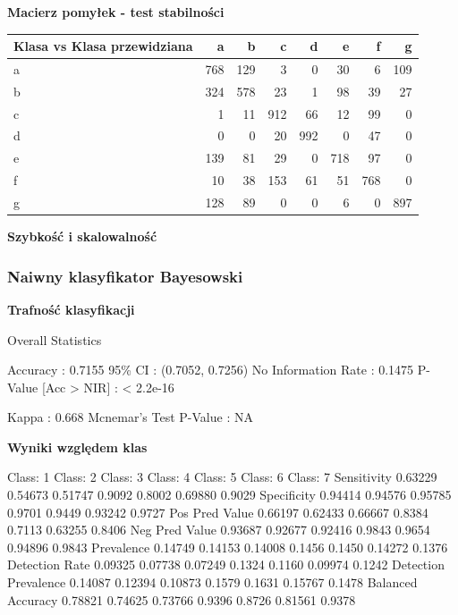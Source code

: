\documentclass[11pt]{article} %
\begin{document}
\textbf{Macierz pomyłek - test stabilności}

\begin{center}
    \begin{tabular}{ | l | r | r | r | r | r | r | r | }
    \hline
 Klasa vs Klasa przewidziana &  a &  b &  c &  d &  e &  f &  g \\ \hline
a & 768 & 129 &  3 &  0 & 30  & 6 & 109 \\
b & 324 & 578 & 23 &  1 & 98 & 39 & 27 \\
c &  1 & 11 & 912 & 66 & 12 & 99 &  0 \\
d &  0  & 0 & 20 & 992 &  0 & 47 &  0 \\
e & 139 & 81 & 29 &  0 & 718 & 97 &  0 \\
f & 10 & 38 & 153 & 61 & 51 & 768 &  0 \\
g & 128 & 89 &  0 &  0 &  6  & 0 & 897 \\ \hline
    \end{tabular}
\end{center}

\textbf{Szybkość i skalowalność}

\subsubsection{Naiwny klasyfikator Bayesowski}

\textbf{Trafność klasyfikacji}

    Overall Statistics
                                          
               Accuracy : 0.7155          
                 95\% CI : (0.7052, 0.7256)
    No Information Rate : 0.1475          
    P-Value [Acc > NIR] : < 2.2e-16       
                                          
                  Kappa : 0.668           
 Mcnemar's Test P-Value : NA 

\textbf{Wyniki względem klas}

Class: 1 Class: 2 Class: 3 Class: 4 Class: 5 Class: 6 Class: 7
Sensitivity           0.63229  0.54673  0.51747   0.9092   0.8002  0.69880   0.9029
Specificity           0.94414  0.94576  0.95785   0.9701   0.9449  0.93242   0.9727
Pos Pred Value        0.66197  0.62433  0.66667   0.8384   0.7113  0.63255   0.8406
Neg Pred Value        0.93687  0.92677  0.92416   0.9843   0.9654  0.94896   0.9843
Prevalence            0.14749  0.14153  0.14008   0.1456   0.1450  0.14272   0.1376
Detection Rate        0.09325  0.07738  0.07249   0.1324   0.1160  0.09974   0.1242
Detection Prevalence  0.14087  0.12394  0.10873   0.1579   0.1631  0.15767   0.1478
Balanced Accuracy     0.78821  0.74625  0.73766   0.9396   0.8726  0.81561   0.9378
\end{document}
